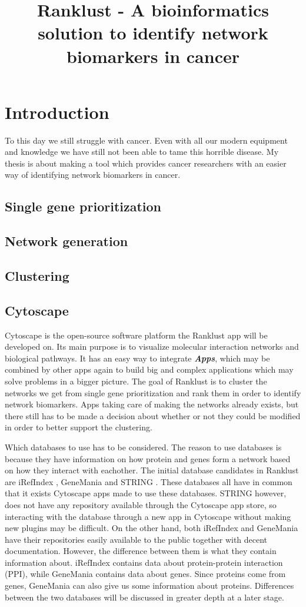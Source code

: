 \documentclass[UKenglish,11pt,twoside,a4paper]{report}
\title{Ranklust - A bioinformatics solution to identify network biomarkers in cancer}
\begin{document}
\maketitle
\tableofcontents{}
\part{Introduction}
To this day we still struggle with cancer. Even with all our modern equipment and knowledge we have still not been able
to tame this horrible disease. My thesis is about making a tool which provides cancer researchers with an easier way of
identifying network biomarkers in cancer. 
\chapter{Single gene prioritization}
\chapter{Network generation}
\chapter{Clustering}
\chapter{Cytoscape}
Cytoscape is the open-source software platform the Ranklust app will be developed on. Its main purpose is to visualize
molecular interaction networks and biological pathways. It has an easy way to integrate \textbf{\textit{Apps}}, which may
be combined by other apps again to build big and complex applications which may solve problems in a bigger picture. The
goal of Ranklust is to cluster the networks we get from single gene prioritization and rank them in order to identify
network biomarkers. Apps taking care of making the networks already exists, but there still has to be made a decision
about whether or not they could be modified in order to better support the clustering.

Which databases to use has to be considered. The reason to use databases is because they have information on how protein 
and genes form a network based on how they interact with eachother. The initial database candidates in Ranklust are
iRefIndex \cite{iri}, GeneMania \cite{gm} and STRING \cite{str}. These databases all have in common that it exists
Cytoscape apps made to use these databases. STRING however, does not have any repository available through the Cytoscape
app store, so interacting with the database through a new app in Cytoscape without making new plugins may be difficult. 
On the other hand, both iRefIndex and GeneMania have their repositories easily available to the public together with 
decent documentation. However, the difference between them is what they contain information about. iRefIndex contains 
data about protein-protein interaction (PPI), while GeneMania contains data about genes. 
Since proteins come from genes, GeneMania can also give us some information about proteins. Differences between the
two databases will be discussed in greater depth at a later stage.
\end{document}
